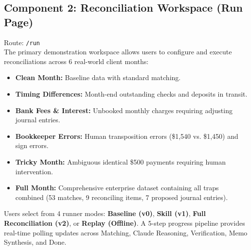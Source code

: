 \documentclass[10pt,a4paper]{article}
\begin{document}
\subsection{Component 2: Reconciliation Workspace (Run Page)}
Route: \texttt{/run} \\
The primary demonstration workspace allows users to configure and execute reconciliations across 6 real-world client months:
\begin{itemize}[noitemsep]
    \item \textbf{Clean Month:} Baseline data with standard matching.
    \item \textbf{Timing Differences:} Month-end outstanding checks and deposits in transit.
    \item \textbf{Bank Fees \& Interest:} Unbooked monthly charges requiring adjusting journal entries.
    \item \textbf{Bookkeeper Errors:} Human transposition errors (\$1,540 vs. \$1,450) and sign errors.
    \item \textbf{Tricky Month:} Ambiguous identical \$500 payments requiring human intervention.
    \item \textbf{Full Month:} Comprehensive enterprise dataset containing all traps combined (53 matches, 9 reconciling items, 7 proposed journal entries).
\end{itemize}
Users select from 4 runner modes: \textbf{Baseline (v0)}, \textbf{Skill (v1)}, \textbf{Full Reconciliation (v2)}, or \textbf{Replay (Offline)}. A 5-step progress pipeline provides real-time polling updates across Matching, Claude Reasoning, Verification, Memo Synthesis, and Done.
\end{document}
